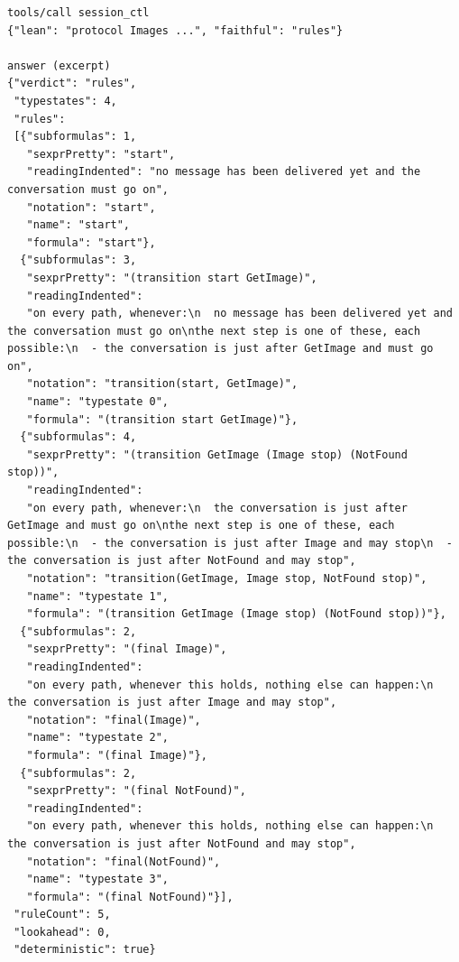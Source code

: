 \begin{lstlisting}[language={},basicstyle=\ttfamily\footnotesize,breaklines=true]
tools/call session_ctl
{"lean": "protocol Images ...", "faithful": "rules"}

answer (excerpt)
{"verdict": "rules",
 "typestates": 4,
 "rules":
 [{"subformulas": 1,
   "sexprPretty": "start",
   "readingIndented": "no message has been delivered yet and the conversation must go on",
   "notation": "start",
   "name": "start",
   "formula": "start"},
  {"subformulas": 3,
   "sexprPretty": "(transition start GetImage)",
   "readingIndented":
   "on every path, whenever:\n  no message has been delivered yet and the conversation must go on\nthe next step is one of these, each possible:\n  - the conversation is just after GetImage and must go on",
   "notation": "transition(start, GetImage)",
   "name": "typestate 0",
   "formula": "(transition start GetImage)"},
  {"subformulas": 4,
   "sexprPretty": "(transition GetImage (Image stop) (NotFound stop))",
   "readingIndented":
   "on every path, whenever:\n  the conversation is just after GetImage and must go on\nthe next step is one of these, each possible:\n  - the conversation is just after Image and may stop\n  - the conversation is just after NotFound and may stop",
   "notation": "transition(GetImage, Image stop, NotFound stop)",
   "name": "typestate 1",
   "formula": "(transition GetImage (Image stop) (NotFound stop))"},
  {"subformulas": 2,
   "sexprPretty": "(final Image)",
   "readingIndented":
   "on every path, whenever this holds, nothing else can happen:\n  the conversation is just after Image and may stop",
   "notation": "final(Image)",
   "name": "typestate 2",
   "formula": "(final Image)"},
  {"subformulas": 2,
   "sexprPretty": "(final NotFound)",
   "readingIndented":
   "on every path, whenever this holds, nothing else can happen:\n  the conversation is just after NotFound and may stop",
   "notation": "final(NotFound)",
   "name": "typestate 3",
   "formula": "(final NotFound)"}],
 "ruleCount": 5,
 "lookahead": 0,
 "deterministic": true}
\end{lstlisting}
